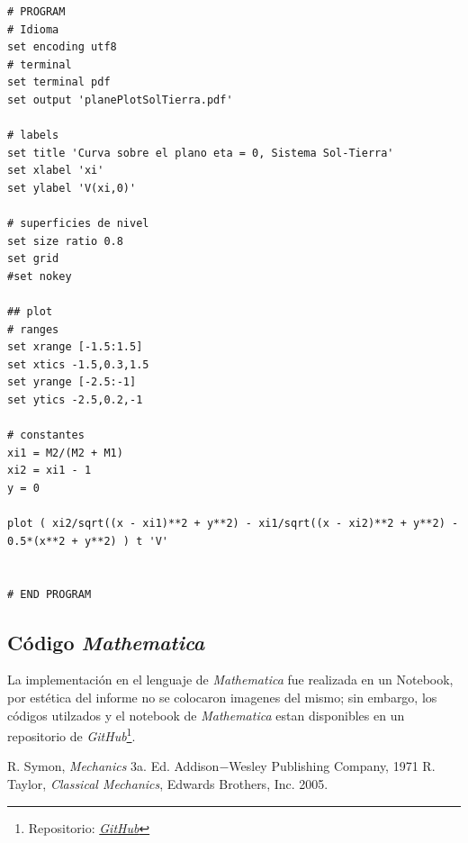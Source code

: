 \begin{lstlisting}
# PROGRAM
# Idioma
set encoding utf8
# terminal
set terminal pdf
set output 'planePlotSolTierra.pdf'

# labels
set title 'Curva sobre el plano eta = 0, Sistema Sol-Tierra'
set xlabel 'xi'
set ylabel 'V(xi,0)'

# superficies de nivel
set size ratio 0.8
set grid
#set nokey

## plot
# ranges
set xrange [-1.5:1.5]
set xtics -1.5,0.3,1.5
set yrange [-2.5:-1]
set ytics -2.5,0.2,-1

# constantes
xi1 = M2/(M2 + M1)
xi2 = xi1 - 1
y = 0

plot ( xi2/sqrt((x - xi1)**2 + y**2) - xi1/sqrt((x - xi2)**2 + y**2) - 0.5*(x**2 + y**2) ) t 'V'


# END PROGRAM
\end{lstlisting}

\subsection{Código \textit{Mathematica}}
La implementación en el lenguaje de \textit{Mathematica} fue realizada en un Notebook, por estética del informe no se colocaron imagenes del mismo; sin embargo, los códigos utilzados y el notebook de \textit{Mathematica} estan disponibles en un repositorio de \textit{GitHub}\footnote{Repositorio: \href{https://github.com/DSarceno/Semestre5/tree/main/Mecanica2/Proyecto/Informe}{\textit{GitHub}}}.

%

\nocite{*}
%
%

\begin{thebibliography}{00}
 R. Symon, \textit{Mechanics} 3a. Ed. Addison$-$Wesley Publishing Company, 1971
 R. Taylor, \textit{Classical Mechanics}, Edwards Brothers, Inc. 2005.
\end{thebibliography}






